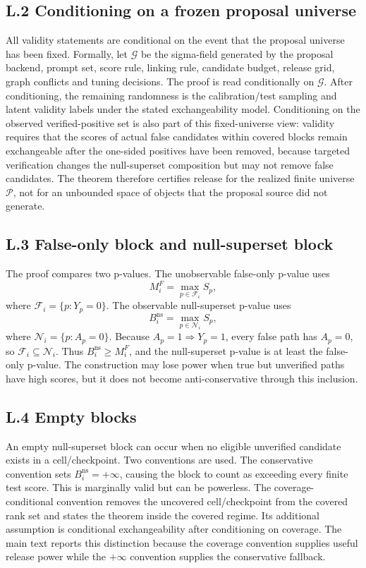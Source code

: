 \documentclass[11pt]{article}
\newcommand{\Pcal}{\mathcal P}
\newcommand{\Ncal}{\mathcal N}
\newcommand{\Fcal}{\mathcal F}
\begin{document}
\subsection*{L.2 Conditioning on a frozen proposal universe}

All validity statements are conditional on the event that the proposal universe has been fixed.
Formally, let \(\mathcal G\) be the sigma-field generated by the proposal backend, prompt set, score rule, linking rule, candidate budget, release grid, graph conflicts and tuning decisions.
The proof is read conditionally on \(\mathcal G\).
After conditioning, the remaining randomness is the calibration/test sampling and latent validity labels under the stated exchangeability model.
Conditioning on the observed verified-positive set is also part of this fixed-universe view: validity requires that the scores of actual false candidates within covered blocks remain exchangeable after the one-sided positives have been removed, because targeted verification changes the null-superset composition but may not remove false candidates.
The theorem therefore certifies release for the realized finite universe \(\Pcal\), not for an unbounded space of objects that the proposal source did not generate.

\subsection*{L.3 False-only block and null-superset block}

The proof compares two p-values.
The unobservable false-only p-value uses
\[
M_i^F=\max_{p\in\Fcal_i}S_p,
\]
where \(\Fcal_i=\{p:Y_p=0\}\).
The observable null-superset p-value uses
\[
B_i^{\mathrm{ns}}=\max_{p\in\Ncal_i}S_p,
\]
where \(\Ncal_i=\{p:A_p=0\}\).
Because \(A_p=1\Rightarrow Y_p=1\), every false path has \(A_p=0\), so \(\Fcal_i\subseteq\Ncal_i\).
Thus \(B_i^{\mathrm{ns}}\ge M_i^F\), and the null-superset p-value is at least the false-only p-value.
The construction may lose power when true but unverified paths have high scores, but it does not become anti-conservative through this inclusion.

\subsection*{L.4 Empty blocks}

An empty null-superset block can occur when no eligible unverified candidate exists in a cell/checkpoint.
Two conventions are used.
The conservative convention sets \(B_i^{\mathrm{ns}}=+\infty\), causing the block to count as exceeding every finite test score.
This is marginally valid but can be powerless.
The coverage-conditional convention removes the uncovered cell/checkpoint from the covered rank set and states the theorem inside the covered regime.
Its additional assumption is conditional exchangeability after conditioning on coverage.
The main text reports this distinction because the coverage convention supplies useful release power while the \(+\infty\) convention supplies the conservative fallback.
\end{document}
